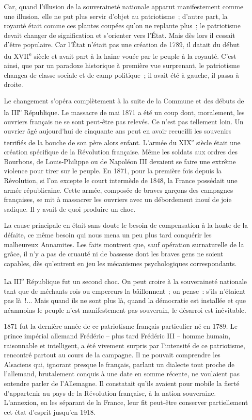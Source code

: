 \documentclass[french,twoside]{book} %
\begin{document}
Car, quand l'illusion de la souveraineté nationale apparut manifestement comme une illusion, elle ne put plus servir d'objet au patriotisme ; d'autre part, la royauté était comme ces plantes coupées qu'on ne replante plus ; le patriotisme devait changer de signification et s'orienter vers l'État. Mais dès lors il cessait d'être populaire. Car l'État n'était pas une création de 1789, il datait du début du XVII\textsuperscript{e} siècle et avait part à la haine vouée par le peuple à la royauté. C'est ainsi, que par un paradoxe historique à première vue surprenant, le patriotisme changea de classe sociale et de camp politique ; il avait été à gauche, il passa à droite.\par
Le changement s'opéra complètement à la suite de la Commune et des débuts de la III\textsuperscript{e} République. Le massacre de mai 1871 a été un coup dont, moralement, les ouvriers français ne se sont peut-être pas relevés. Ce n'est pas tellement loin. Un ouvrier âgé aujourd'hui de cinquante ans peut en avoir recueilli les souvenirs terrifiés de la bouche de son père alors enfant. L'armée du XIX\textsuperscript{e} siècle était une création spécifique de la Révolution française. Même les soldats aux ordres des Bourbons, de Louis-Philippe ou de Napoléon III devaient se faire une extrême violence pour tirer sur le peuple. En 1871, pour la première fois depuis la Révolution, si l'on excepte le court intermède de 1848, la France possédait une armée républicaine. Cette armée, composée de braves garçons des campagnes françaises, se mit à massacrer les ouvriers avec un débordement inouï de joie sadique. Il y avait de quoi produire un choc.\par
La cause principale en était sans doute le besoin de compensation à la honte de la défaite, ce même besoin qui nous mena un peu plus tard conquérir les malheureux Annamites. Les faits montrent que, sauf opération surnaturelle de la grâce, il n'y a pas de cruauté ni de bassesse dont les braves gens ne soient capables, dès qu'entrent en jeu les mécanismes psychologiques correspondants.\par
La III\textsuperscript{e} République fut un second choc. On peut croire à la souveraineté nationale tant que de méchants rois ou empereurs la bâillonnent ; on pense : s'ils n'étaient pas là !... Mais quand ils ne sont plus là, quand la démocratie est installée et que néanmoins le peuple n'est manifestement pas souverain, le désarroi est inévitable.\par
1871 fut la dernière année de ce patriotisme français particulier né en 1789. Le prince impérial allemand Frédéric – plus tard Frédéric III – homme humain, raisonnable et intelligent, a été vivement surpris par l'intensité de ce patriotisme, rencontré partout au cours de la campagne. Il ne pouvait comprendre les Alsaciens qui, ignorant presque le français, parlant un dialecte tout proche de l'allemand, brutalement conquis à une date en somme récente, ne voulaient pas entendre parler de l'Allemagne. Il constatait qu'ils avaient pour mobile la fierté d'appartenir au pays de la Révolution française, à la nation souveraine. L'annexion, en les séparant de la France, leur fit peut-être conserver partiellement cet état d'esprit jusqu'en 1918.\par
\end{document}
